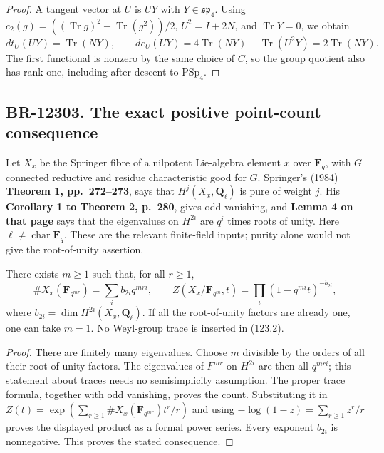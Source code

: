 \documentclass[11pt,a4paper]{article}
\theoremstyle{definition}\newtheorem{definition}[theorem]{Definition}
\theoremstyle{remark}\newtheorem{remark}[theorem]{Remark}
\begin{document}
\begin{proof}
A tangent vector at \(U\) is \(UY\) with
\(Y\in\mathfrak{sp}_4\). Using
\(c_2(g)=((\operatorname{Tr}g)^2-\operatorname{Tr}(g^2))/2\),
\(U^2=I+2N\), and \(\operatorname{Tr}Y=0\), we obtain
\[
 dt_U(UY)=\operatorname{Tr}(NY),\qquad
 de_U(UY)=4\operatorname{Tr}(NY)-\operatorname{Tr}(U^2Y)
          =2\operatorname{Tr}(NY).
\]
The first functional is nonzero by the same choice of
\(C\), so the group quotient also has rank one, including
after descent to \(\mathrm{PSp}_4\).
\end{proof}

\subsection{BR-12303. The exact positive point-count consequence}
Let \(X_x\) be the Springer fibre of a nilpotent Lie-algebra
element \(x\) over \(\mathbf F_q\), with \(G\) connected reductive and residue
characteristic good for \(G\). Springer's (1984)
\textbf{Theorem 1, pp.~272--273}, says that \(H^j(X_x,\mathbf Q_\ell)\)
is pure of weight \(j\). His \textbf{Corollary 1 to Theorem 2,
p.~280}, gives odd vanishing, and \textbf{Lemma 4 on that page}
says that the eigenvalues on \(H^{2i}\) are \(q^i\) times
roots of unity. Here \(\ell\ne\operatorname{char}\mathbf F_q\).
These are the relevant finite-field inputs; purity alone
would not give the root-of-unity assertion.

There exists \(m\geq1\) such that, for all \(r\geq1\),
\[
 \#X_x(\mathbf F_{q^{mr}})
       =\sum_i b_{2i}q^{mri},\qquad
 Z(X_x/\mathbf F_{q^m},t)
       =\prod_i(1-q^{mi}t)^{-b_{2i}},
 \tag{123.2}
\]
where \(b_{2i}=\dim H^{2i}(X_x,\mathbf Q_\ell)\).
If all the root-of-unity factors are already one, one
can take \(m=1\). No Weyl-group trace is inserted in (123.2).

\begin{proof}
There are finitely many eigenvalues. Choose \(m\) divisible
by the orders of all their root-of-unity factors. The
eigenvalues of \(F^{mr}\) on \(H^{2i}\) are then all
\(q^{mri}\); this statement about traces needs no
semisimplicity assumption. The proper trace formula,
together with odd vanishing, proves the count. Substituting
it in \(Z(t)=\exp(\sum_{r\geq1}\#X_x(\mathbf F_{q^{mr}})t^r/r)\)
and using \(-\log(1-z)=\sum_{r\geq1}z^r/r\) proves the
displayed product as a formal power series. Every exponent
\(b_{2i}\) is nonnegative. This proves the stated consequence.
\end{proof}
\end{document}

